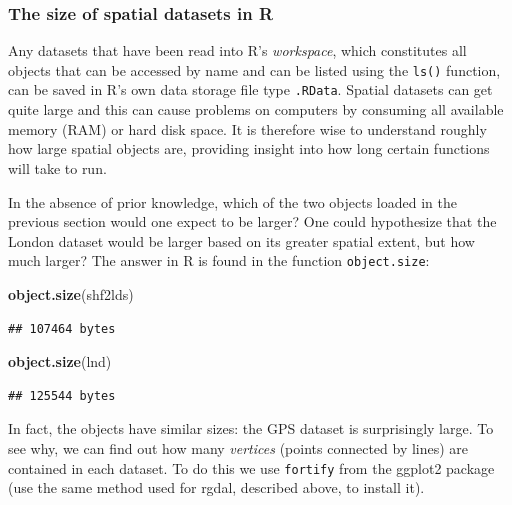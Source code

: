 \documentclass[]{article}
\newenvironment{Shaded}{}{}
\newcommand{\KeywordTok}[1]{\textcolor[rgb]{0.00,0.44,0.13}{\textbf{{#1}}}}
\newcommand{\NormalTok}[1]{{#1}}
\begin{document}
\subsubsection{The size of spatial datasets in R}

Any datasets that have been read into R's \emph{workspace}, which
constitutes all objects that can be accessed by name and can be listed
using the \texttt{ls()} function, can be saved in R's own data storage
file type \texttt{.RData}. Spatial datasets can get quite large and this
can cause problems on computers by consuming all available memory (RAM)
or hard disk space. It is therefore wise to understand roughly how large
spatial objects are, providing insight into how long certain functions
will take to run.

In the absence of prior knowledge, which of the two objects loaded in
the previous section would one expect to be larger? One could
hypothesize that the London dataset would be larger based on its greater
spatial extent, but how much larger? The answer in R is found in the
function \texttt{object.size}:

\begin{Shaded}
\begin{Highlighting}[]
\KeywordTok{object.size}\NormalTok{(shf2lds)}
\end{Highlighting}
\end{Shaded}
\begin{verbatim}
## 107464 bytes
\end{verbatim}
\begin{Shaded}
\begin{Highlighting}[]
\KeywordTok{object.size}\NormalTok{(lnd)}
\end{Highlighting}
\end{Shaded}
\begin{verbatim}
## 125544 bytes
\end{verbatim}
In fact, the objects have similar sizes: the GPS dataset is surprisingly
large. To see why, we can find out how many \emph{vertices} (points
connected by lines) are contained in each dataset. To do this we use
\texttt{fortify} from the ggplot2 package (use the same method used for
rgdal, described above, to install it).
\end{document}
